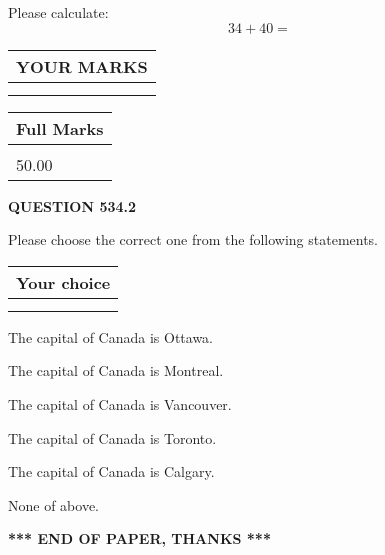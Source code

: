 \documentclass[12pt]{article}
\begin{document}
  
 
Please calculate:
\begin{equation}
34 +  %
40 = \nonumber
\end{equation}
 

 

 
  
\vspace{0.2in}
  
\noindent\begin{tabular}{|l|}
\hline
 YOUR MARKS  \\
\hline
 \\ 
 \\ 
\hline
\end{tabular}
\hspace{0.05in} \begin{tabular}{|l|}
\hline
 Full Marks  \\
\hline
 \\ 
50.00 \\
\hline
\end{tabular}
{\textbf{\Large{QUESTION
534.2 
}}}
  
  
Please choose the correct one from the following statements.
  
  
\noindent\hspace{3.0in} \begin{tabular}{|l|}
\hline
Your choice \\
\hline
 \\ 
 \\ 
\hline
\end{tabular}
  
  
 
 
The capital of Canada is Ottawa.
 
 
The capital of Canada is Montreal.
 
 
The capital of Canada is Vancouver.
 
 
The capital of Canada is Toronto.
 
 
The capital of Canada is Calgary.
 
 
 None of above.
 
 
   
   
 \vspace{0.2in}
 
   
   
   
   
\vspace{1.0in} 
{\textbf{\large{ *** END OF PAPER, THANKS *** }}} 
   
\end{document}
